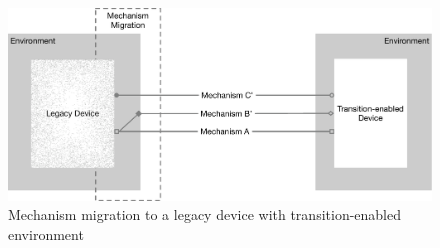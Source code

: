 







\begin{figure}
    \centering
    \includegraphics[width=.8\linewidth]{figures/MechanismMigration.pdf}
    \caption{Mechanism migration to a legacy device with transition-enabled environment}
    \label{fig:bigpicture}
\end{figure}

